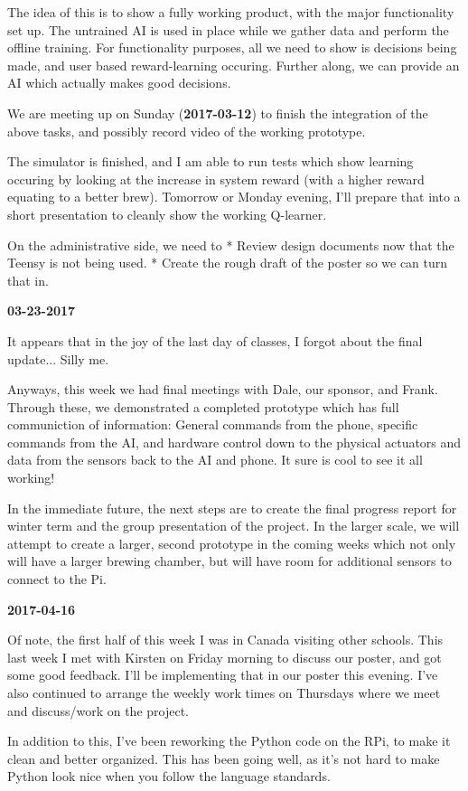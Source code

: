     The idea of this is to show a fully working product, with the major functionality set up. The untrained AI is used in place while we gather data and perform the offline training. For functionality purposes, all we need to show is decisions being made, and user based reward-learning occuring. Further along, we can provide an AI which actually makes good decisions.

We are meeting up on Sunday (\textbf{2017-03-12}) to finish the integration of the above tasks, and possibly record video of the working prototype.

The simulator is finished, and I am able to run tests which show learning occuring by looking at the increase in system reward (with a higher reward equating to a better brew). Tomorrow or Monday evening, I'll prepare that into a short presentation to cleanly show the working Q-learner.

On the administrative side, we need to
* Review design documents now that the Teensy is not being used.
* Create the rough draft of the poster so we can turn that in.

\textbf{03-23-2017}

It appears that in the joy of the last day of classes, I forgot about the final update... Silly me.

Anyways, this week we had final meetings with Dale, our sponsor, and Frank. Through these, we demonstrated a completed prototype which has full communiction of information: General commands from the phone, specific commands from the AI, and hardware control down to the physical actuators and data from the sensors back to the AI and phone. It sure is cool to see it all working!

In the immediate future, the next steps are to create the final progress report for winter term and the group presentation of the project.
In the larger scale, we will attempt to create a larger, second prototype in the coming weeks which not only will have a larger brewing chamber, but will have room for additional sensors to connect to the Pi.

\textbf{2017-04-16}

Of note, the first half of this week I was in Canada visiting other schools.
This last week I met with Kirsten on Friday morning to discuss our poster, and got some good feedback. I'll be implementing that in our poster this evening.
I've also continued to arrange the weekly work times on Thursdays where we meet and discuss/work on the project.

In addition to this, I've been reworking the Python code on the RPi, to make it clean and better organized. This has been going well, as it's not hard to make Python look nice when you follow the language standards.

